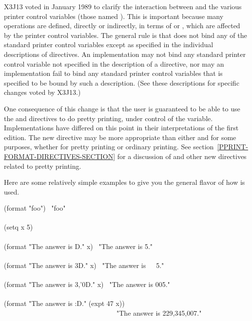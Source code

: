 
\begin{new}
X3J13 voted in January 1989
to clarify the interaction between 
and the various printer control variables (those named ).
This is important because many  operations are defined, directly
or indirectly, in terms of  or , which are affected
by the printer control variables.  The general rule is that 
does not bind any of the standard printer control variables except as
specified in the individual descriptions of directives.  An implementation
may not bind any standard printer control variable not specified in the
description of a  directive, nor may an implementation fail
to bind any standard printer control variables that is specified to be bound
by such a description.  (See these
descriptions for specific changes voted by X3J13.)

One consequence of this change is that the user is guaranteed to be able
to use the   and  directives
to do pretty printing, under control of the  variable.
Implementations have differed on this point in their interpretations of
the first edition.  The new  directive may be more appropriate
than either  and  for some purposes,
whether for pretty printing or ordinary printing.
See section~\ref{PPRINT-FORMAT-DIRECTIVES-SECTION} for a discussion of
 and other new  directives related to pretty printing.
\end{new}


Here are some relatively simple examples to give you the general
flavor of how  is used.
\begin{lisp}
(format {\false} "foo") \EV\ "foo" \\
 \\
(setq x 5) \\
 \\
(format {\false} "The answer is {\Xtilde}D." x) \EV\ "The answer is 5." \\
 \\
(format {\false} "The answer is {\Xtilde}3D." x) \EV\ "The answer is~~~5." \\
 \\
(format {\false} "The answer is {\Xtilde}3,'0D." x) \EV\ "The answer is 005." \\
 \\
(format {\false} "The answer is {\Xtilde}:D." (expt 47 x)) \\
~~~~~~~~~~~~~~~~~~~~~~~~~~~~~~~~\EV\ "The answer is 229,345,007."
\end{lisp}

